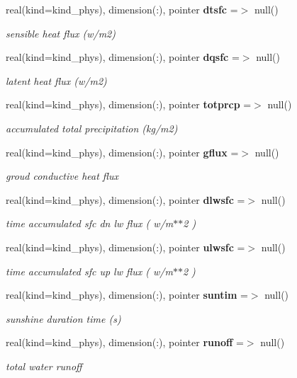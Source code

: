 \begin{DoxyCompactItemize}
real(kind=kind\+\_\+phys), dimension(\+:), pointer \textbf{ dtsfc} =$>$ null()
\begin{DoxyCompactList}\small\item\em sensible heat flux (w/m2) \end{DoxyCompactList}\item 
real(kind=kind\+\_\+phys), dimension(\+:), pointer \textbf{ dqsfc} =$>$ null()
\begin{DoxyCompactList}\small\item\em latent heat flux (w/m2) \end{DoxyCompactList}\item 
real(kind=kind\+\_\+phys), dimension(\+:), pointer \textbf{ totprcp} =$>$ null()
\begin{DoxyCompactList}\small\item\em accumulated total precipitation (kg/m2) \end{DoxyCompactList}\item 
real(kind=kind\+\_\+phys), dimension(\+:), pointer \textbf{ gflux} =$>$ null()
\begin{DoxyCompactList}\small\item\em groud conductive heat flux \end{DoxyCompactList}\item 
real(kind=kind\+\_\+phys), dimension(\+:), pointer \textbf{ dlwsfc} =$>$ null()
\begin{DoxyCompactList}\small\item\em time accumulated sfc dn lw flux ( w/m$\ast$$\ast$2 ) \end{DoxyCompactList}\item 
real(kind=kind\+\_\+phys), dimension(\+:), pointer \textbf{ ulwsfc} =$>$ null()
\begin{DoxyCompactList}\small\item\em time accumulated sfc up lw flux ( w/m$\ast$$\ast$2 ) \end{DoxyCompactList}\item 
real(kind=kind\+\_\+phys), dimension(\+:), pointer \textbf{ suntim} =$>$ null()
\begin{DoxyCompactList}\small\item\em sunshine duration time (s) \end{DoxyCompactList}\item 
real(kind=kind\+\_\+phys), dimension(\+:), pointer \textbf{ runoff} =$>$ null()
\begin{DoxyCompactList}\small\item\em total water runoff \end{DoxyCompactList}\item 

\end{DoxyCompactItemize}
